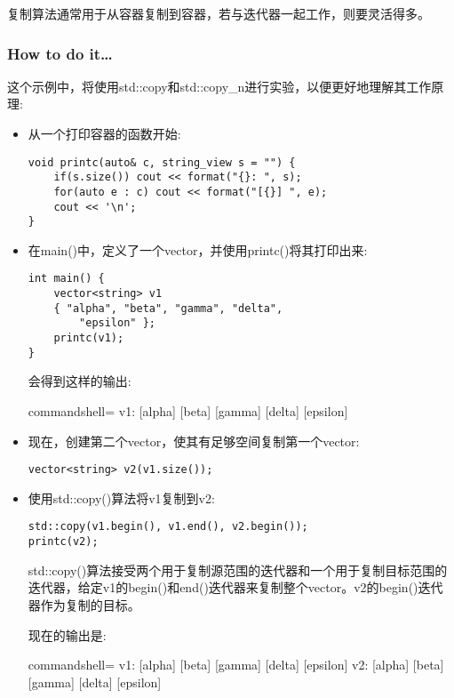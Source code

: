
复制算法通常用于从容器复制到容器，若与迭代器一起工作，则要灵活得多。


\subsubsection{How to do it…}

这个示例中，将使用std::copy和std::copy\_n进行实验，以便更好地理解其工作原理:

\begin{itemize}
\item 
从一个打印容器的函数开始:

\begin{lstlisting}[style=styleCXX]
void printc(auto& c, string_view s = "") {
	if(s.size()) cout << format("{}: ", s);
	for(auto e : c) cout << format("[{}] ", e);
	cout << '\n';
}
\end{lstlisting}

\item 
在main()中，定义了一个vector，并使用printc()将其打印出来:

\begin{lstlisting}[style=styleCXX]
int main() {
	vector<string> v1
	{ "alpha", "beta", "gamma", "delta",
		"epsilon" };
	printc(v1);
}
\end{lstlisting}

会得到这样的输出:

\begin{tcblisting}{commandshell={}}
v1: [alpha] [beta] [gamma] [delta] [epsilon]
\end{tcblisting}

\item 
现在，创建第二个vector，使其有足够空间复制第一个vector:

\begin{lstlisting}[style=styleCXX]
vector<string> v2(v1.size());
\end{lstlisting}

\item 
使用std::copy()算法将v1复制到v2:

\begin{lstlisting}[style=styleCXX]
std::copy(v1.begin(), v1.end(), v2.begin());
printc(v2);
\end{lstlisting}

std::copy()算法接受两个用于复制源范围的迭代器和一个用于复制目标范围的迭代器，给定v1的begin()和end()迭代器来复制整个vector。v2的begin()迭代器作为复制的目标。

现在的输出是:

\begin{tcblisting}{commandshell={}}
v1: [alpha] [beta] [gamma] [delta] [epsilon]
v2: [alpha] [beta] [gamma] [delta] [epsilon]
\end{tcblisting}


\end{itemize}
